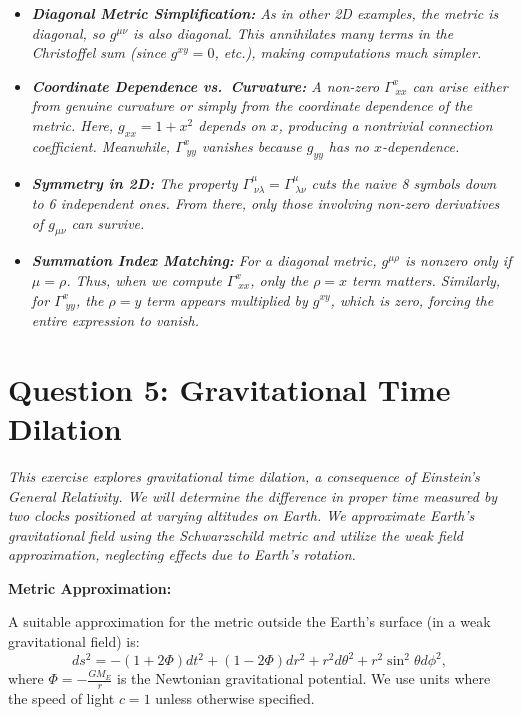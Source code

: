 \documentclass{article}
\begin{document}
\begin{itemize}
    \item \emph{\textbf{Diagonal Metric Simplification:} As in other 2D examples, the metric is diagonal, so \(g^{\mu\nu}\) is also diagonal. This annihilates many terms in the Christoffel sum (since \(g^{xy} = 0\), etc.), making computations much simpler.}

    \item \emph{\textbf{Coordinate Dependence vs.\ Curvature:} A non-zero \(\Gamma^x_{\;xx}\) can arise either from genuine curvature or simply from the coordinate dependence of the metric. Here, \(g_{xx} = 1 + x^2\) depends on \(x\), producing a nontrivial connection coefficient. Meanwhile, \(\Gamma^x_{\;yy}\) vanishes because \(g_{yy}\) has no \(x\)-dependence.}

    \item \emph{\textbf{Symmetry in 2D:} The property \(\Gamma^\mu_{\;\nu\lambda} = \Gamma^\mu_{\;\lambda\nu}\) cuts the naive 8 symbols down to 6 independent ones. From there, only those involving non-zero derivatives of \(g_{\mu\nu}\) can survive.}

    \item \emph{\textbf{Summation Index Matching:} For a diagonal metric, \(g^{\mu\rho}\) is nonzero only if \(\mu = \rho\). Thus, when we compute \(\Gamma^x_{\;xx}\), only the \(\rho = x\) term matters. Similarly, for \(\Gamma^x_{\;yy}\), the \(\rho = y\) term appears multiplied by \(g^{xy}\), which is zero, forcing the entire expression to vanish.}
\end{itemize}

\pagebreak

\section*{Question 5: Gravitational Time Dilation}

\textit{This exercise explores gravitational time dilation, a consequence of Einstein's General Relativity. We will determine the difference in proper time measured by two clocks positioned at varying altitudes on Earth. We approximate Earth's gravitational field using the Schwarzschild metric and utilize the weak field approximation, neglecting effects due to Earth's rotation.}

\textbf{Metric Approximation:}

A suitable approximation for the metric outside the Earth's surface (in a weak gravitational field) is:
\[
ds^2 = -\left(1+2\Phi\right)dt^2 + \left(1-2\Phi\right)dr^2 + r^2d\theta^2 + r^2\sin^2\theta d\phi^2,
\]
where $\Phi = -\frac{GM_E}{r}$ is the Newtonian gravitational potential. We use units where the speed of light $c=1$ unless otherwise specified.
\end{document}
